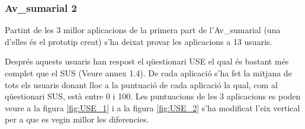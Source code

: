 \subsubsection{\Gls{Av_sumarial} 2}
Partint de les 3 millor aplicacions de la primera part de l'\gls{Av_sumarial} (una d'elles és el prototip creat) s'ha deixat provar les aplicacions a 13 usuaris. 

Després aquests usuaris han respost el qüestionari USE el qual és bastant més complet que el SUS (Veure annex 1.4). De cada aplicació s'ha fet la mitjana de tots els usuaris donant lloc a la puntuació de cada aplicació la qual, com al qüestionari SUS, està entre 0 i 100. Les puntuacions de les 3 aplicacions es poden veure a la figura \ref{fig:USE_1} i a la figura \ref{fig:USE_2} s'ha modificat l'eix vertical per a que es vegin millor les diferencies.

